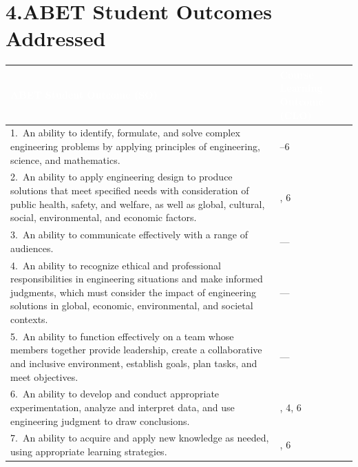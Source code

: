 \documentclass[11pt,a4paper]{article}
\begin{document}
\section*{4.\quad ABET Student Outcomes Addressed}
\renewcommand{\arraystretch}{1.35}
\begin{tabularx}{\linewidth}{X >{\centering\arraybackslash}p{3.2cm}}
  \toprule
  \rowcolor{kmutnbBlue!90}
  \textcolor{white}{\textbf{ABET Student Outcome (SO)}} &
  \textcolor{white}{\textbf{Course Learning Outcome (CLO)}} \\
  \midrule
  1.\ An ability to identify, formulate, and solve complex engineering problems
      by applying principles of engineering, science, and mathematics.
  & 1--6 \\
  \rowcolor{lightGray}
  2.\ An ability to apply engineering design to produce solutions that meet
      specified needs with consideration of public health, safety, and welfare,
      as well as global, cultural, social, environmental, and economic factors.
  & 4, 6 \\
  3.\ An ability to communicate effectively with a range of audiences.
  & --- \\
  \rowcolor{lightGray}
  4.\ An ability to recognize ethical and professional responsibilities in
      engineering situations and make informed judgments, which must consider
      the impact of engineering solutions in global, economic, environmental,
      and societal contexts.
  & --- \\
  5.\ An ability to function effectively on a team whose members together
      provide leadership, create a collaborative and inclusive environment,
      establish goals, plan tasks, and meet objectives.
  & --- \\
  \rowcolor{lightGray}
  6.\ An ability to develop and conduct appropriate experimentation, analyze
      and interpret data, and use engineering judgment to draw conclusions.
  & 2, 4, 6 \\
  7.\ An ability to acquire and apply new knowledge as needed, using
      appropriate learning strategies.
  & 4, 6 \\
  \bottomrule
\end{tabularx}

\end{document}
